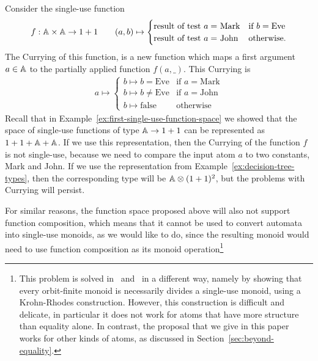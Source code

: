 \begin{example}\label{ex:Currying-not-single-use}
    Consider  the single-use function
    \begin{align*}
    f : \mathbb A \times \mathbb A \to 1 + 1 \qquad (a,b)  
    \mapsto \begin{cases}
        \text{result of test $a = $ Mark} & \text{if } b = \text{Eve} \\
        \text{result of test $a = $ John} & \text{otherwise}.
        \end{cases}
    \end{align*}
The Currying of this function, is a new function which  maps a first argument $a \in \mathbb A$ to the partially applied function $f(a,\_)$. This Currying is
\begin{align*}
    a \mapsto \begin{cases}
        b \mapsto b = \text{Eve} & \text{if } a = \text{Mark} \\
        b \mapsto b \neq \text{Eve} & \text{if } a = \text{John} \\
        b \mapsto \text{false} & \text{otherwise}
        \end{cases}
\end{align*}
Recall that in Example~\ref{ex:first-single-use-function-space} we showed that the space of single-use functions of type $\mathbb A \to 1 + 1$ can be represented as $1 + 1 + \mathbb A + \mathbb A$. If we use this representation,  then the Currying of the function $f$  is not single-use, because we need to compare the input atom $a$ to two constants, Mark and John. If we use the representation from Example~\ref{ex:decision-tree-types}, then the corresponding type will be $\mathbb A \otimes (1 + 1)^2$, but the problems with Currying will persist. \exampleend
\end{example}

For similar reasons, 
the function space proposed above will also not support function composition, which means that it cannot be used to convert automata into single-use monoids, as we would like to do, since the resulting monoid would need to use function composition as its monoid operation\footnote{This problem is solved in~\cite{bojanczykstefanski2020} and~\cite{stefanski-phd} in a different way, namely by showing that every orbit-finite monoid is necessarily divides a single-use monoid, using a  Krohn-Rhodes construction. However, this construction is difficult and delicate, in particular it does not work for atoms that have more structure than equality alone. In contrast, the proposal that we give in this paper works for other kinds of atoms, as discussed in Section~\ref{sec:beyond-equality}. }


